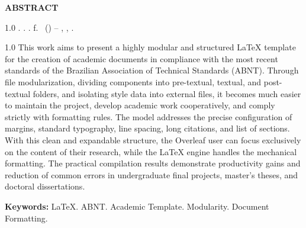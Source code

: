 
\begin{center}
  \textbf{ABSTRACT}
\end{center}

\vspace{0.8cm}

\begin{spacing}{1.0}
  \noindent
  \MakeUppercase{\meuautor}. \textbf{\meutitulo}. \meuano. \pageref{LastPage} f. \tipotrabalho\ (\grauacademicopretendido) -- \minhainstituicao, \meulocal, \meuano.
\end{spacing}

\vspace{0.8cm}

\begin{spacing}{1.0}
  \noindent
  This work aims to present a highly modular and structured LaTeX template for the creation of academic documents in compliance with the most recent standards of the Brazilian Association of Technical Standards (ABNT). Through file modularization, dividing components into pre-textual, textual, and post-textual folders, and isolating style data into external files, it becomes much easier to maintain the project, develop academic work cooperatively, and comply strictly with formatting rules. The model addresses the precise configuration of margins, standard typography, line spacing, long citations, and list of sections. With this clean and expandable structure, the Overleaf user can focus exclusively on the content of their research, while the LaTeX engine handles the mechanical formatting. The practical compilation results demonstrate productivity gains and reduction of common errors in undergraduate final projects, master's theses, and doctoral dissertations.
\end{spacing}

\vspace{1cm}

\noindent
\textbf{Keywords:} LaTeX. ABNT. Academic Template. Modularity. Document Formatting.
